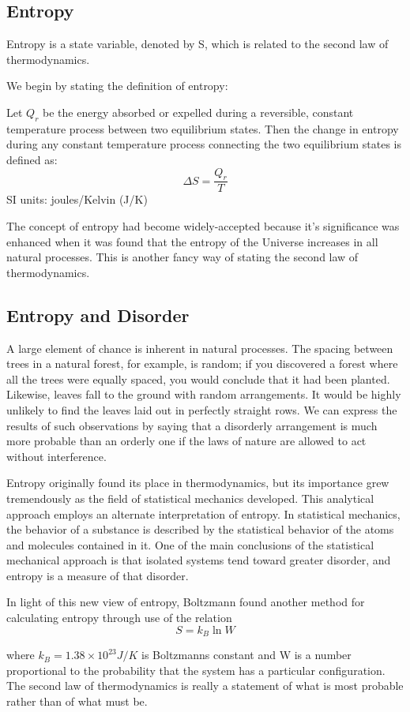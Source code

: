 \subsection{Entropy}
Entropy is a state variable, denoted by S, which is related to the second law of thermodynamics.

We begin by stating the definition of entropy:

\begin{defi}[Entropy]
Let $Q_{r}$ be the energy absorbed or expelled during a reversible, constant temperature process between two equilibrium states. Then the change in entropy during any constant temperature process connecting the two equilibrium states is defined as:
$$\Delta S=\frac{Q_{r}}{T}$$
SI units: joules/Kelvin (J/K)
\end{defi}

The concept of entropy had become widely-accepted because it's significance was enhanced when it was found that the entropy of the Universe increases in all natural processes. This is another fancy way of stating the second law of thermodynamics.

\subsection{Entropy and Disorder}

A large element of chance is inherent in natural processes. The spacing between trees in a natural forest, for example, is random; if you discovered a forest where all the trees were equally spaced, you would conclude that it had been planted. Likewise, leaves fall to the ground with random arrangements. It would be highly unlikely to find the leaves laid out in perfectly straight rows. We can express the results of such observations by saying that a disorderly arrangement is much more probable than an orderly one if the laws of nature are allowed to act without interference.

Entropy originally found its place in thermodynamics, but its importance grew tremendously as the field of statistical mechanics developed. This analytical approach employs an alternate interpretation of entropy. In statistical mechanics, the behavior of a substance is described by the statistical behavior of the atoms and molecules contained in it. One of the main conclusions of the statistical mechanical approach is that isolated systems tend toward greater disorder, and entropy is a measure of that disorder.

In light of this new view of entropy, Boltzmann found another method for calculating entropy through use of the relation
$$S=k_{B}\ln W$$

where $k_{B}= 1.38 \times 10^{23} J/K$ is Boltzmanns constant and W is a number proportional to the probability that the system has a particular configuration. The second law of thermodynamics is really a statement of what is most probable rather than of what must be.